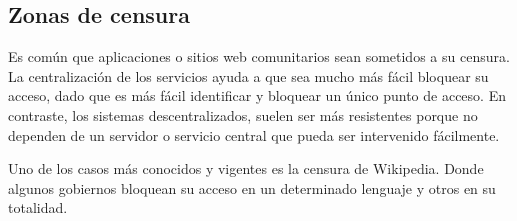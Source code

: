 \subsection{Zonas de censura}
Es común que aplicaciones o sitios web comunitarios sean sometidos a su censura. La centralización de los servicios ayuda a que sea mucho más fácil bloquear su acceso, dado que es más fácil identificar y bloquear un único punto de acceso. En contraste, los sistemas descentralizados, suelen ser más resistentes porque no dependen de un servidor o servicio central que pueda ser intervenido fácilmente.

Uno de los casos más conocidos y vigentes es la censura de Wikipedia. Donde algunos gobiernos bloquean su acceso en un determinado lenguaje y otros en su totalidad. \parencite{censorship-wikipedia}

